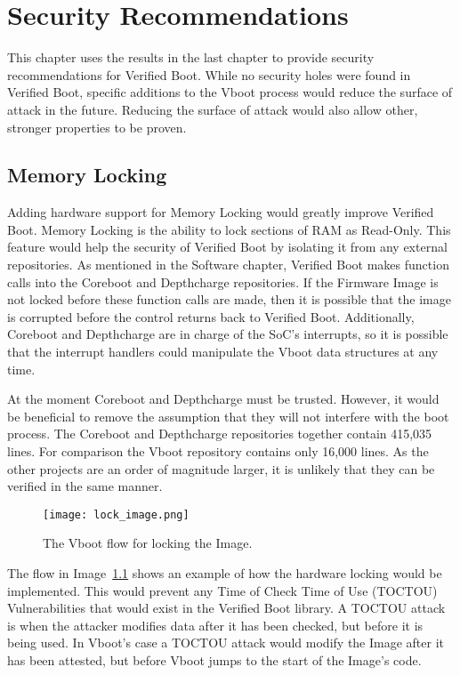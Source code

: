 \chapter{Security Recommendations}

This chapter uses the results in the last chapter to provide security
recommendations for Verified Boot.
While no security holes were found in Verified Boot, specific additions to the
Vboot process would reduce the surface of attack in the future.
Reducing the surface of attack would also allow other, stronger properties to be
proven.

\section{Memory Locking}

Adding hardware support for Memory Locking would greatly improve Verified Boot.
Memory Locking is the ability to lock sections of RAM as Read-Only.
This feature would help the security of Verified Boot by isolating it from
any external repositories.
As mentioned in the Software chapter, Verified Boot makes function calls into
the Coreboot and Depthcharge repositories.
If the Firmware Image is not locked before these function calls are made, then
it is possible that the image is corrupted before the control returns back to
Verified Boot.
Additionally, Coreboot and Depthcharge are in charge of the SoC's interrupts,
so it is possible that the interrupt handlers could manipulate the Vboot data
structures at any time.

At the moment Coreboot and Depthcharge must be trusted.
However, it would be beneficial to remove the assumption that they will not
interfere with the boot process.
The Coreboot and Depthcharge repositories together contain 415,035 lines. 
For comparison the Vboot repository contains only 16,000 lines. 
As the other projects are an order of magnitude larger, it is unlikely that they
can be verified in the same manner.



\begin{figure}
  \centering
  \texttt{[image: lock\_image.png]}
  \caption[Verified Boot Program Flow with Locking]{The Vboot flow for locking the
      Image.
  }\label{fig:lock_flow}
\end{figure}

The flow in Image~\ref{fig:lock_flow} shows an example of how the hardware locking 
would be implemented.
This would prevent any Time of Check Time of Use (TOCTOU) Vulnerabilities that
would exist in the Verified Boot library.
A TOCTOU attack is when the attacker modifies data after it has been checked,
but before it is being used.
In Vboot's case a TOCTOU attack would modify the Image after it has been
attested, but before Vboot jumps to the start of the Image's code.

